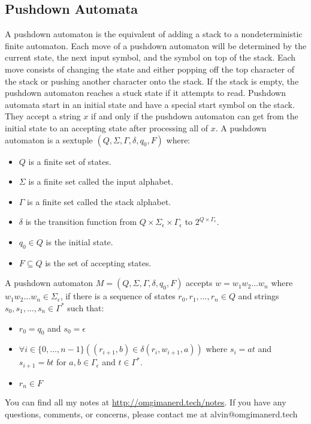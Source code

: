 \documentclass{math}
\begin{document}
\subsection*{Pushdown Automata}
A pushdown automaton is the equivalent of adding a stack to a nondeterministic
finite automaton. Each move of a pushdown automaton will be determined by the
current state, the next input symbol, and the symbol on top of the stack. Each
move consists of changing the state and either popping off the top character of
the stack or pushing another character onto the stack. If the stack is empty,
the pushdown automaton reaches a stuck state if it attempts to read. Pushdown
automata start in an initial state and have a special start symbol on the
stack. They accept a string \( x \) if and only if the pushdown automaton can
get from the initial state to an accepting state after processing all of
\( x \). A pushdown automaton is a sextuple \( (Q,\Sigma,\Gamma,\delta,q_0,F) \)
where:
\begin{itemize}
  \item \( Q \) is a finite set of states.
  \item \( \Sigma \) is a finite set called the input alphabet.
  \item \( \Gamma \) is a finite set called the stack alphabet.
  \item \( \delta \) is the transition function from \( Q\times\Sigma_{\epsilon}
  \times\Gamma_{\epsilon} \) to \( 2^{Q\times\Gamma_{\epsilon}} \).
  \item \( q_0\in Q \) is the initial state.
  \item \( F\subseteq Q \) is the set of accepting states.
\end{itemize}
A pushdown automaton \( M = (Q,\Sigma,\Gamma,\delta,q_0,F) \) accepts
\( w = w_1w_2\dots w_n \) where \( w_1w_2\dots w_n\in\Sigma_{\epsilon} \), if
there is a sequence of states \( r_0,r_1,\dots,r_n\in Q \) and strings
\( s_0,s_1,\dots,s_n\in\Gamma^* \) such that:
\begin{itemize}
  \item \( r_0 = q_0 \) and \( s_0 = \epsilon \)
  \item \( \forall{i}\in\{0,\dots,n-1\}((r_{i+1},b)\in\delta(r_i,w_{i+1},a)) \)
  where \( s_i = at \) and \( s_{i+1} = bt \) for \( a,b\in\Gamma_{\epsilon} \)
  and \( t\in\Gamma^* \).
  \item \( r_n\in F \)
\end{itemize}

\begin{center}
  You can find all my notes at \url{http://omgimanerd.tech/notes}. If you have
  any questions, comments, or concerns, please contact me at
  alvin@omgimanerd.tech
\end{center}
\end{document}
